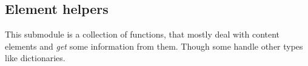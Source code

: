 \begin{itemize}
\begin{Shaded}
\begin{Highlighting}[]
\OperatorTok{{-}}\OperatorTok{=}\NormalTok{(}\NormalTok{))}

\OperatorTok{{-}}\OperatorTok{=}\NormalTok{)}
\end{Highlighting}
\end{Shaded}
\end{itemize}

\subsection{Element helpers}\label{element-helpers}

\begin{Shaded}
\begin{Highlighting}[]
\OperatorTok{:} 
\end{Highlighting}
\end{Shaded}

This submodule is a collection of functions, that mostly deal with
content elements and \emph{get} some information from them. Though some
handle other types like dictionaries.

